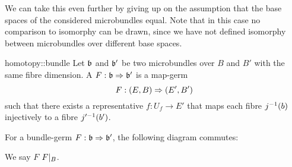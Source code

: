 \begin{myparagraph}
    We can take this even further by giving up on the assumption that the base spaces of the considered microbundles equal.
    Note that in this case no comparison to isomorphy can be drawn,
    since we have not defined isomorphy between microbundles over different base spaces.
\end{myparagraph}

\begin{mydefinition}{homotopy::bundle}
    Let $\mathfrak{b}$ and $\mathfrak{b}'$ be two microbundles over $B$ and $B'$ with the same fibre dimension.
    A  $F: \mathfrak{b} \Rightarrow{} \mathfrak{b}'$ is a map-germ
    \[ F: (E, B) \Rightarrow{} (E', B') \]
    such that there exists a representative $f: U_f \to E'$ that maps each fibre $j^{-1}(b)$ injectively to a fibre $j'^{-1}(b')$.
\end{mydefinition}

\begin{myparagraph}
    For a bundle-germ $F: \mathfrak{b} \Rightarrow{} \mathfrak{b}'$, the following diagram commutes:
    \begin{center}
    \end{center}
    We say $F$  $F\vert_{B}$.
\end{myparagraph}